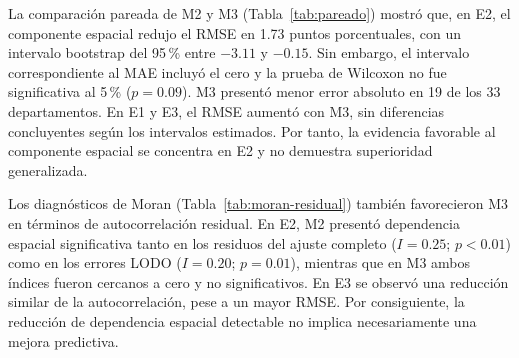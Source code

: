 La comparación pareada de M2 y M3 (Tabla~\ref{tab:pareado}) mostró que, en E2, el componente espacial redujo el RMSE en 1.73 puntos porcentuales, con un intervalo bootstrap del 95\,\% entre $-3.11$ y $-0.15$. Sin embargo, el intervalo correspondiente al MAE incluyó el cero y la prueba de Wilcoxon no fue significativa al 5\,\% ($p=0.09$). M3 presentó menor error absoluto en 19 de los 33 departamentos. En E1 y E3, el RMSE aumentó con M3, sin diferencias concluyentes según los intervalos estimados. Por tanto, la evidencia favorable al componente espacial se concentra en E2 y no demuestra superioridad generalizada.

\begin{table}[!htbp]
\centering
\footnotesize
\caption{Comparación pareada de M2 y M3 mediante LODO. Las diferencias corresponden a M3 menos M2; los intervalos de confianza del 95\,\% se obtuvieron mediante bootstrap pareado departamental (10{,}000 remuestreos). M3 mejor: número de departamentos con menor error absoluto en M3.}
\label{tab:pareado}
\renewcommand{\arraystretch}{1.1}
\setlength{\tabcolsep}{3pt}
\end{table}

Los diagnósticos de Moran (Tabla~\ref{tab:moran-residual}) también favorecieron M3 en términos de autocorrelación residual. En E2, M2 presentó dependencia espacial significativa tanto en los residuos del ajuste completo ($I=0.25$; $p<0.01$) como en los errores LODO ($I=0.20$; $p=0.01$), mientras que en M3 ambos índices fueron cercanos a cero y no significativos. En E3 se observó una reducción similar de la autocorrelación, pese a un mayor RMSE. Por consiguiente, la reducción de dependencia espacial detectable no implica necesariamente una mejora predictiva.

